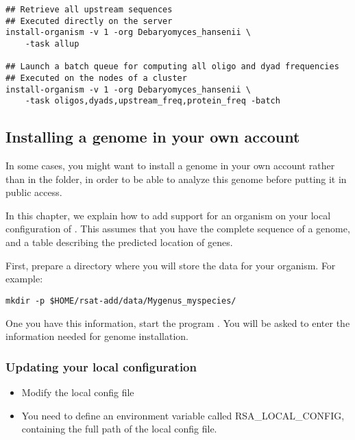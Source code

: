 \begin{footnotesize}
\begin{verbatim}
## Retrieve all upstream sequences
## Executed directly on the server
install-organism -v 1 -org Debaryomyces_hansenii \
    -task allup

## Launch a batch queue for computing all oligo and dyad frequencies
## Executed on the nodes of a cluster
install-organism -v 1 -org Debaryomyces_hansenii \
    -task oligos,dyads,upstream_freq,protein_freq -batch
\end{verbatim}
\end{footnotesize}

\subsection{Installing a genome in your own account}

In some cases, you might want to install a genome in your own account
rather than in the \RSAT folder, in order to be able to analyze this
genome before putting it in public access.


In this chapter, we explain how to add support for an organism on your
local configuration of \RSAT. This assumes that you have the complete
sequence of a genome, and a table describing the predicted location of
genes.

First, prepare a directory where you will store the data for your
organism. For example:

\begin{footnotesize}
\begin{verbatim}
mkdir -p $HOME/rsat-add/data/Mygenus_myspecies/
\end{verbatim}
\end{footnotesize}


One you have this information, start the program
. You will be asked to enter the information
needed for genome installation.

\subsubsection{Updating your local configuration}


\begin{itemize}
\item Modify the local config file

\item You need to define an environment variable called
  RSA\_LOCAL\_CONFIG, containing the full path of the local config
  file.

\end{itemize}



